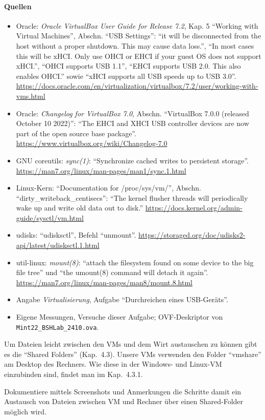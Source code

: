 \paragraph{Quellen}
\begin{itemize}[quellen]
  \item Oracle: \emph{Oracle VirtualBox User Guide for Release 7.2}, Kap. 5 \enquote{Working with Virtual Machines}, Abschn. \enquote{USB Settings}: \enquote{it will be disconnected from the host without a proper shutdown. This may cause data loss.}, \enquote{In most cases this will be xHCI. Only use OHCI or EHCI if your guest OS does not support xHCI.}, \enquote{OHCI supports USB 1.1}, \enquote{EHCI supports USB 2.0. This also enables OHCI.} sowie \enquote{xHCI supports all USB speeds up to USB 3.0}. \url{https://docs.oracle.com/en/virtualization/virtualbox/7.2/user/working-with-vms.html}
  \item Oracle: \emph{Changelog for VirtualBox 7.0}, Abschn. \enquote{VirtualBox 7.0.0 (released October 10 2022)}: \enquote{The EHCI and XHCI USB controller devices are now part of the open source base package}. \url{https://www.virtualbox.org/wiki/Changelog-7.0}
  \item GNU coreutils: \emph{sync(1)}: \enquote{Synchronize cached writes to persistent storage}. \url{https://man7.org/linux/man-pages/man1/sync.1.html}
  \item Linux-Kern: \enquote{Documentation for /proc/sys/vm/}, Abschn. \enquote{dirty\_writeback\_centisecs}: \enquote{The kernel flusher threads will periodically wake up and write old data out to disk.} \url{https://docs.kernel.org/admin-guide/sysctl/vm.html}
  \item udisks: \enquote{udisksctl}, Befehl \enquote{unmount}. \url{https://storaged.org/doc/udisks2-api/latest/udisksctl.1.html}
  \item util-linux: \emph{mount(8)}: \enquote{attach the filesystem found on some device to the big file tree} und \enquote{the umount(8) command will detach it again}. \url{https://man7.org/linux/man-pages/man8/mount.8.html}
  \item Angabe \emph{Virtualisierung}, Aufgabe \enquote{Durchreichen eines USB-Geräts}.
  \item Eigene Messungen, Versuche dieser Aufgabe; OVF-Deskriptor von \nolinkurl{Mint22_BSHLab_2410.ova}.
\end{itemize}

\begin{aufgabe}
Um Dateien leicht zwischen den VMs und dem Wirt austauschen zu können gibt es die \enquote{Shared Folders} (Kap.~4.3). Unsere VMs verwenden den Folder \enquote{vmshare} am Desktop des Rechners. Wie diese in der Windows- und Linux-VM einzubinden sind, findet man im Kap.~4.3.1.

Dokumentiere mittels Screenshots und Anmerkungen die Schritte damit ein Austausch von Dateien zwischen VM und Rechner über einen Shared-Folder möglich wird.
\end{aufgabe}
\label{sec:sf-einrichten}

